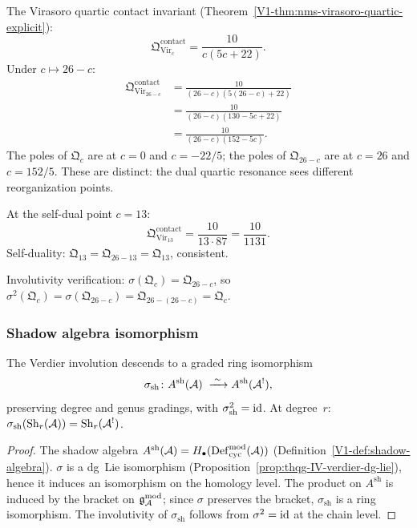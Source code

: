 \begin{computation}
The Virasoro quartic contact invariant (Theorem~\ref{V1-thm:nms-virasoro-quartic-explicit}):
\[
\mathfrak{Q}^{\mathrm{contact}}_{\mathrm{Vir}_c}
= \frac{10}{c(5c + 22)}.
\]
Under $c \mapsto 26 - c$:
\begin{align*}
\mathfrak{Q}^{\mathrm{contact}}_{\mathrm{Vir}_{26-c}}
&= \frac{10}{(26-c)(5(26-c) + 22)} \\[4pt]
&= \frac{10}{(26-c)(130-5c+22)} \\[4pt]
&= \frac{10}{(26-c)(152-5c)}.
\end{align*}
The poles of $\mathfrak{Q}_c$ are at $c = 0$ and $c = -22/5$;
the poles of $\mathfrak{Q}_{26-c}$ are at $c = 26$ and $c = 152/5$.
These are distinct: the dual quartic resonance sees different
reorganization points.

At the self-dual point $c = 13$:
\[
\mathfrak{Q}^{\mathrm{contact}}_{\mathrm{Vir}_{13}}
= \frac{10}{13 \cdot 87}
= \frac{10}{1131}.
\]
Self-duality: $\mathfrak{Q}_{13} = \mathfrak{Q}_{26-13} = \mathfrak{Q}_{13}$,
consistent.

Involutivity verification:
$\sigma(\mathfrak{Q}_c) = \mathfrak{Q}_{26-c}$, so
$\sigma^2(\mathfrak{Q}_c)
= \sigma(\mathfrak{Q}_{26-c})
= \mathfrak{Q}_{26-(26-c)}
= \mathfrak{Q}_c$.
\end{computation}

\subsubsection{Shadow algebra isomorphism}

\begin{proposition}
The Verdier involution descends to a graded ring isomorphism
\begin{equation}%
\sigma_{\mathrm{sh}}\colon
A^{\mathrm{sh}}(\cA)
\;\xrightarrow{\;\sim\;}
A^{\mathrm{sh}}(\cA^!),
\end{equation}
preserving degree and genus gradings, with $\sigma_{\mathrm{sh}}^2 = \mathrm{id}$.
At degree~$r$:
$\sigma_{\mathrm{sh}}(\mathrm{Sh}_r(\mathcal{A})) = \mathrm{Sh}_r(\mathcal{A}^!)$.
\end{proposition}

\begin{proof}
The shadow algebra $A^{\mathrm{sh}}(\mathcal{A}) = H_\bullet(\mathrm{Def}_{\mathrm{cyc}}^{\mathrm{mod}}(\mathcal{A}))$
(Definition~\ref{V1-def:shadow-algebra}).
$\sigma$ is a dg~Lie isomorphism
(Proposition~\ref{prop:thqg-IV-verdier-dg-lie}),
hence it induces an isomorphism on the homology level.
The product on $A^{\mathrm{sh}}$ is induced by the bracket on $\mathfrak{g}_{\mathcal{A}}^{\mathrm{mod}}$;
since $\sigma$ preserves the bracket, $\sigma_{\mathrm{sh}}$ is a ring
isomorphism. The involutivity of $\sigma_{\mathrm{sh}}$ follows from
$\sigma^2 = \mathrm{id}$ at the chain level.
\end{proof}

